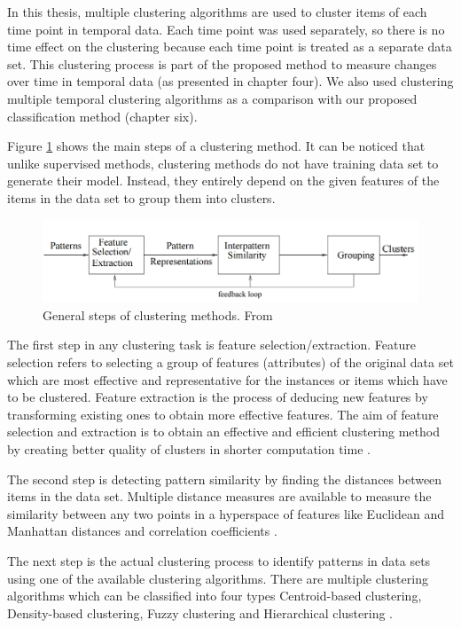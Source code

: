 In this thesis, multiple clustering algorithms are used to cluster items of each time point in temporal data. Each time point was used separately, so there is no time effect on the clustering because each time point is treated as a separate data set. This clustering process is part of the proposed method to measure changes over time in temporal data (as presented in chapter four). We also used clustering multiple temporal clustering algorithms as a comparison with our proposed classification method (chapter six).

Figure \ref{fig:Clustering} shows the main steps of a clustering method. It can be noticed that unlike supervised methods, clustering methods do not have training data set to generate their model. Instead, they entirely depend on the given features of the items in the data set to group them into clusters. 

\begin{figure}[!h]
    \includegraphics[scale=0.4]{images/chapter2/ClusteringSteps.png}
    \caption{General steps of clustering methods. From \cite{Jain1999}}
    \label{fig:Clustering}
\end{figure}

The first step in any clustering task is feature selection/extraction. Feature selection refers to selecting a group of features (attributes) of the original data set which are most effective and representative for the instances or items which have to be clustered. Feature extraction is the process of deducing new features by transforming existing ones to obtain more effective features. The aim of feature selection and extraction is to obtain an effective and efficient clustering method by creating better quality of clusters in shorter computation time \cite{Jain1999}.

The second step is detecting pattern similarity by finding the distances between items in the data set. Multiple distance measures are available to measure the similarity between any two points in a hyperspace of features like Euclidean and Manhattan distances and correlation coefficients \cite{Jain1999}.

The next step is the actual clustering process to identify patterns in data sets using one of the available clustering algorithms. There are multiple clustering algorithms which can be classified into four types Centroid-based clustering, Density-based clustering, Fuzzy clustering and Hierarchical clustering \cite{Zaki2014}.

